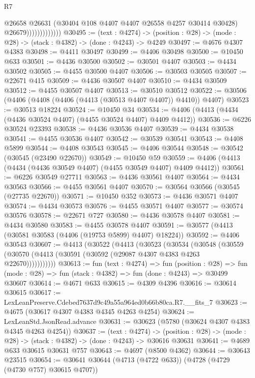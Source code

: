 \begin{lexlean}{R7}
\begin{coremodule}
                              @26658
                              @26631
                              (@30404 @108 @4407 @4407 @26558 @4257 @30414 @30428)
                              @26679)))))))))))))
@30495 := (text : @4274) ->
  (position : @28) -> (mode : @28) -> (stack : @4382) -> (done : @4243) -> @4249
@30497 := @4676 @4307 @4383
@30498 := @4411 @30497
@30499 := @4406 @30498
@30500 := @10450 @633
@30501 := @4436 @30500
@30502 := @30501 @4407
@30503 := @4434 @30502
@30505 := @4455 @30500 @4407
@30506 := @30503 @30505
@30507 := @22671 @415
@30509 := @4436 @30507 @4407
@30510 := @4434 @30509
@30512 := @4455 @30507 @4407
@30513 := @30510 @30512
@30522 := @30506 (@4406 (@4408 (@4406 (@4413 (@30513 @4407 @4407)) @4410)) @4407)
@30523 := @30513 @18224
@30524 := @10450 @34
@30534 := @4406 (@4413 (@4434 (@4436 @30524 @4407) (@4455 @30524 @4407) @4409 @4412))
@30536 := @6226 @30524 @23393
@30538 := @4436 @30536 @4407
@30539 := @4434 @30538
@30541 := @4455 @30536 @4407
@30542 := @30539 @30541
@30543 := @4408 @5899
@30544 := @4408 @30543
@30545 := @4406 @30544
@30548 := @30542 (@30545 (@23490 @22670))
@30549 := @10450 @59
@30559 := @4406 (@4413 (@4434 (@4436 @30549 @4407) (@4455 @30549 @4407) @4409 @4412))
@30561 := @6226 @30549 @27711
@30563 := @4436 @30561 @4407
@30564 := @4434 @30563
@30566 := @4455 @30561 @4407
@30570 := @30564 @30566 (@30545 (@27735 @22670))
@30571 := @10450 @352
@30573 := @4436 @30571 @4407
@30574 := @4434 @30573
@30576 := @4455 @30571 @4407
@30577 := @30574 @30576
@30578 := @22671 @727
@30580 := @4436 @30578 @4407
@30581 := @4434 @30580
@30583 := @4455 @30578 @4407
@30591 := @30577 (@4413 (@30581 @30583 (@4406 (@19753 @5899) @4407) @18224))
@30592 := @4406 @30543
@30607 := @4413
    (@30522
      (@4413
        (@30523
          (@30534
            (@30548
              (@30559 (@30570 (@4413 (@30591 (@30592 (@29087 @4307 @4383 @4263 @22670)))))))))))
@30613 := fun (text : @4274) =>
  fun (position : @28) =>
  fun (mode : @28) => fun (stack : @4382) => fun (done : @4243) => @30499 @30607
@30614 := @4671 @633
@30615 := @4309 @4396
@30616 := @30614 @30615
@30617 := LexLeanPreserve.Cdebed7637d9c49a55a964ed0b66b80ca.R7.__fits_7
@30623 := @4675 (@30617 @4307 @4383 @4345 @4263 @4254)
@30624 := LexLeanStd.JsonRead.advance
@30631 := @30623 (@5780 (@30624 @4307 @4383 @4345 @4263 @4254))
@30637 := (text : @4274) ->
  (position : @28) -> (mode : @28) -> (stack : @4382) -> (done : @4243) -> @30616 @30631
@30641 := @4689 @633 @30615 @30631 @757
@30643 := @4697 (@8500 @4362)
@30644 := @30643 @23515
@30654 := @30641 @30644 (@4713 (@4722 @633)) (@4728 (@4729 (@4730 @757) @30615 @4707))

\end{coremodule}
\end{lexlean}
